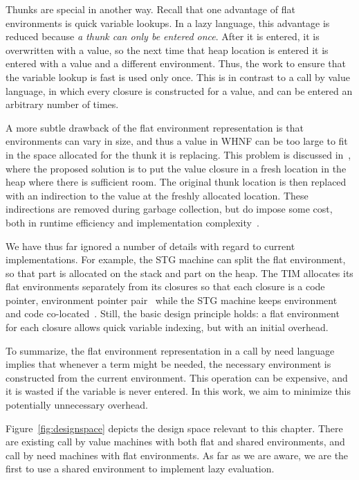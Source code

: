 Thunks are special in another way.  Recall that one advantage of flat
environments is quick variable lookups. In a lazy language, this advantage is
reduced because \emph{a thunk can only be entered once}. After it is entered, it
is overwritten with a value, so the next time that heap location is entered it
is entered with a value and a different environment. Thus, the work to ensure
that the variable lookup is fast is used only once. This is in contrast to
a call by value language, in which every closure is constructed for a value,
and can be entered an arbitrary number of times. 

A more subtle drawback of the flat environment representation is that
environments can vary in size, and thus a value in WHNF can be too large to fit
in the space allocated for the thunk it is replacing. This problem is discussed
in~\cite{jonesstg}, where the proposed solution is to put the value closure in
a fresh location in the heap where there is sufficient room. The original
thunk location is then replaced with an indirection to the value at the freshly
allocated location. These indirections are removed during garbage collection,
but do impose some cost, both in runtime efficiency and implementation
complexity~\cite{jonesstg}.

We have thus far ignored a number of details with regard to current
implementations. For example, the STG machine can split the flat environment, so
that part is allocated on the stack and part on the heap.  The TIM allocates its
flat environments separately from its closures so that each closure is a code
pointer, environment pointer pair~\cite{TIM} while the STG machine keeps
environment and code co-located~\cite{jonesstg}. Still, the basic design
principle holds: a flat environment for each closure allows quick variable
indexing, but with an initial overhead.

To summarize, the flat environment representation in a call by need language
implies that whenever a term might be needed, the necessary environment is
constructed from the current environment.  This operation can be expensive, and
it is wasted if the variable is never entered. In this work, we aim to minimize
this potentially unnecessary overhead.

Figure~\ref{fig:designspace} depicts the design space relevant to this chapter.
There are existing call by value machines with both flat and shared
environments, and call by need machines with flat environments. As far as we are
aware, we are the first to use a shared environment to implement lazy
evaluation. 

